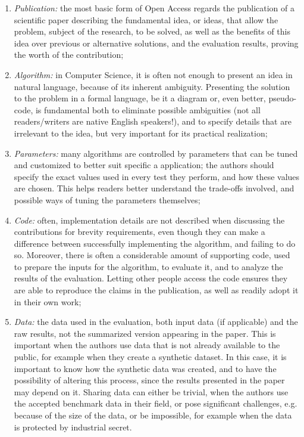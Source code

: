 \documentclass[12pt]{article}
\begin{document}
\begin{enumerate}
\item \emph{Publication:} the most basic form of Open Access regards the publication of a scientific paper describing the fundamental idea, or ideas, that allow the problem, subject of the research, to be solved, as well as the benefits of this idea over previous or alternative solutions, and the evaluation results, proving the worth of the contribution;
\item \emph{Algorithm:} in Computer Science, it is often not enough to present an idea in natural language, because of its inherent ambiguity. Presenting the solution to the problem in a formal language, be it a diagram or, even better, pseudo-code, is fundamental both to eliminate possible ambiguities (not all readers/writers are native English speakers!), and to specify details that are irrelevant to the idea, but very important for its practical realization;
\item \emph{Parameters:} many algorithms are controlled by parameters that can be tuned and customized to better suit specific a application; the authors should specify the exact values used in every test they perform, and how these values are chosen. This helps readers better understand the trade-offs involved, and possible ways of tuning the parameters themselves;
\item \emph{Code:} often, implementation details are not described when discussing the contributions for brevity requirements, even though they can make a difference between successfully implementing the algorithm, and failing to do so. Moreover, there is often a considerable amount of supporting code, used to prepare the inputs for the algorithm, to evaluate it, and to analyze the results of the evaluation. Letting other people access the code ensures they are able to reproduce the claims in the publication, as well as readily adopt it in their own work;
\item \emph{Data:} the data used in the evaluation, both input data (if applicable) and the raw results, not the summarized version appearing in the paper. This is important when the authors use data that is not already available to the public, for example when they create a synthetic dataset. In this case, it is important to know how the synthetic data was created, and to have the possibility of altering this process, since the results presented in the paper may depend on it. Sharing data can either be trivial, when the authors use the accepted benchmark data in their field, or pose significant challenges, e.g. because of the size of the data, or be impossible, for example when the data is protected by industrial secret.
\end{enumerate}
\end{document}
